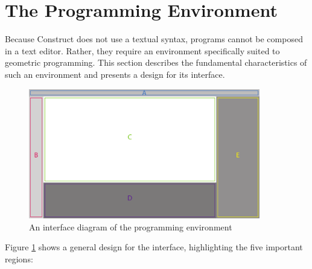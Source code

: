 \documentclass[twoside,openright,11pt]{report}
\begin{document}
\section{The Programming Environment}
\label{sec:environ}

Because Construct does not use a textual syntax, programs cannot be composed in a text editor. 
Rather, they require an environment specifically suited to geometric programming. 
This section describes the fundamental characteristics of such an environment and presents a design for its interface.

\begin{figure}[h]
  \centering
  \includegraphics[width=0.9\textwidth]{interface.pdf}
  \caption{An interface diagram of the programming environment}
  \label{fig:interface}
\end{figure}

Figure \ref{fig:interface} shows a general design for the interface, highlighting the five important regions:
\end{document}
